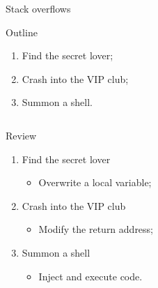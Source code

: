 \documentclass{beamer}
\renewcommand\big[1]{
  \begin{center}
    \Large{#1}
  \end{center}
}
\begin{document}
\begin{frame}
  \centering\Huge{Stack overflows}
\end{frame}

\begin{frame}
  \big{Outline}
  \begin{enumerate}
    \item Find the secret lover;
    \item Crash into the VIP club;
    \item Summon a shell.
  \end{enumerate}
\end{frame}


\begin{frame}[fragile]
  \inputminted[fontsize=\footnotesize]{C}{code/fnf.c}
\end{frame}


\begin{frame}
  \big{Review}
  \begin{enumerate}
    \item Find the secret lover
    \begin{itemize}
      \item[] Overwrite a local variable;
    \end{itemize}
    \item Crash into the VIP club
    \begin{itemize}
      \item[] Modify the return address;
    \end{itemize}
    \item Summon a shell
    \begin{itemize}
      \item[] Inject and execute code.
    \end{itemize}
  \end{enumerate}
\end{frame}
\end{document}
